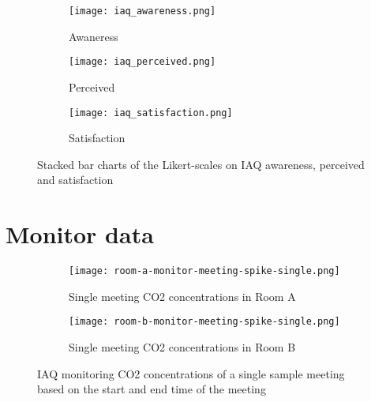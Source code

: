 \begin{appendices}
\begin{figure}[htbp]
    \centering
    \begin{subfigure}{0.18\textwidth}
        \centering
        \texttt{[image: iaq\_awareness.png]}
        \caption{Awaneress}
        \label{fig:image1}
    \end{subfigure}
    \hfill
    \begin{subfigure}{0.18\textwidth}
        \centering
        \texttt{[image: iaq\_perceived.png]}
        \caption{Perceived}
        \label{fig:image2}
    \end{subfigure}
    \hfill
    \begin{subfigure}{0.18\textwidth}
        \centering
        \texttt{[image: iaq\_satisfaction.png]}
        \caption{Satisfaction}
        \label{fig:image2}
    \end{subfigure}    
    \caption{Stacked bar charts of the Likert-scales on IAQ awareness, perceived and satisfaction}
    \label{fig:grid}
\end{figure}

\newpage

\section{Monitor data}
\label{appendix:monitor-data}

\begin{figure}[htbp]
    \centering
    \begin{subfigure}{0.48\textwidth}
        \centering
        \texttt{[image: room-a-monitor-meeting-spike-single.png]}
        \caption{Single meeting CO2 concentrations in Room A}
        \label{fig:image1}
    \end{subfigure}
    \hfill
    \begin{subfigure}{0.48\textwidth}
        \centering
        \texttt{[image: room-b-monitor-meeting-spike-single.png]}
        \caption{Single meeting CO2 concentrations in Room B}
        \label{fig:image2}
    \end{subfigure}
    \caption{IAQ monitoring CO2 concentrations of a single sample meeting based on the start and end time of the meeting}
    \label{fig:grid}
\end{figure}


\end{appendices}
